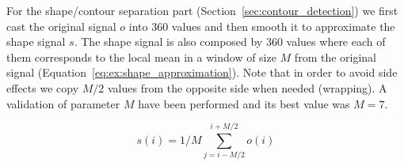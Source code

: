 For the shape/contour separation part (Section~\ref{sec:contour_detection}) we first cast the original signal $o$ into 360 values and then smooth it to approximate the shape signal $s$.
The shape signal is also composed by 360 values where each of them corresponds to the local mean in a window of size $M$ from the original signal (Equation~\ref{eq:ex:shape_approximation}).
Note that in order to avoid side effects we copy $M/2$ values from the opposite side when needed (wrapping).
A validation of parameter $M$ have been performed and its best value was $M=7$.

\begin{equation}
  \label{eq:ex:shape_approximation}
  s(i) = 1/M \sum_{j=i-M/2}^{i+M/2} o(i)
\end{equation}





